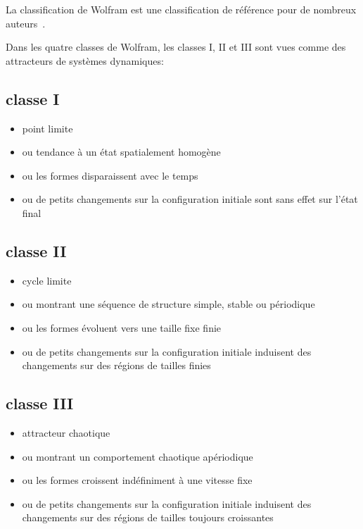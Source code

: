 La classification de Wolfram est une classification de r\'ef\'erence pour
de nombreux
auteurs~\cite[]{Vichniac90,Li90b,Wootters90,McIntosh90,Chate90,Gutowitz90b}.

Dans les quatre classes de Wolfram, %
les classes I, II et III sont vues comme des attracteurs de syst\`emes
dynamiques:

\subsection*{classe I}

\begin{itemize}
\item point limite
\item ou tendance \`a un \'etat spatialement homog\`ene
\item ou les formes disparaissent avec le temps
\item ou de petits changements sur la configuration initiale sont
  sans effet sur l'\'etat final
\end{itemize}

\subsection*{classe II}

\begin{itemize}
\item cycle limite
\item ou montrant une s\'equence de structure simple, stable ou
  p\'eriodique
\item ou les formes \'evoluent vers une taille fixe finie
\item ou de petits changements sur la configuration initiale
  induisent des changements sur des r\'egions de tailles finies
\end{itemize}

\subsection*{classe III}

\begin{itemize}
\item attracteur chaotique
\item ou montrant un comportement chaotique ap\'eriodique
\item ou les formes croissent ind\'efiniment \`a une vitesse fixe
\item ou de petits changements sur la configuration initiale
  induisent des changements sur des r\'egions de tailles toujours
  croissantes
\end{itemize}

